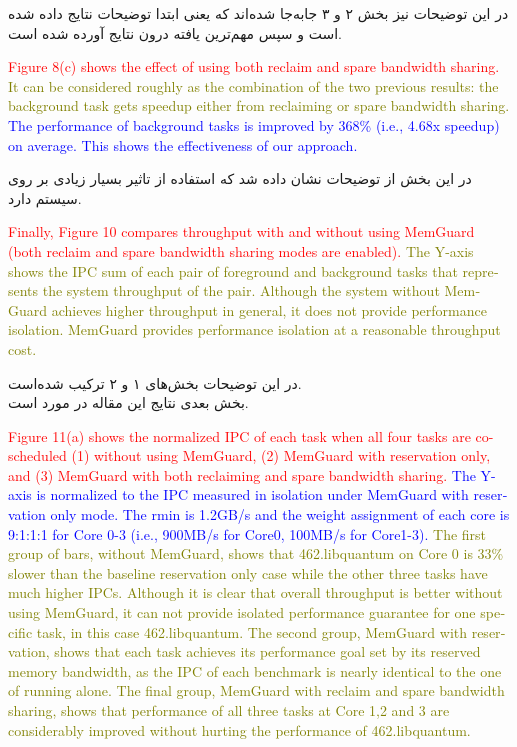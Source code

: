 \documentclass[a4paper, 11pt]{article}
\begin{document}
در این توضیحات نیز بخش ۲ و ۳ جابه‌جا شده‌اند که یعنی ابتدا توضیحات نتایج داده شده است و سپس
مهم‌ترین یافته درون نتایج آورده شده است.
\begin{latin}
\textcolor{red}{Figure 8(c) shows the effect of using both reclaim and
spare bandwidth sharing.}
\textcolor{olive}{It can be considered roughly as
the combination of the two previous results: the background
task gets speedup either from reclaiming or spare bandwidth
sharing.}
\textcolor{blue}{The performance of background tasks is improved by
368\% (i.e., 4.68x speedup) on average. This shows the
effectiveness of our approach.}
\end{latin}
در این بخش از توضیحات نشان داده شد که استفاده از
تاثیر بسیار زیادی بر روی
سیستم دارد.
\begin{latin}
\textcolor{red}{Finally, Figure 10 compares throughput with and without
using MemGuard (both reclaim and spare bandwidth sharing
modes are enabled).}
\textcolor{olive}{The Y-axis shows the IPC sum of each
pair of foreground and background tasks that represents the
system throughput of the pair. Although the system without
MemGuard achieves higher throughput in general, it does not
provide performance isolation. MemGuard provides performance isolation at a reasonable throughput cost.}
\end{latin}
در این توضیحات بخش‌های ۱ و ۲ ترکیب شده‌است. \\
بخش بعدی نتایج این مقاله در مورد
است.
\begin{latin}
\textcolor{red}{Figure 11(a) shows the normalized IPC of each task when
all four tasks are co-scheduled (1) without using MemGuard,
(2) MemGuard with reservation only, and (3) MemGuard with
both reclaiming and spare bandwidth sharing.}
\textcolor{blue}{The Y-axis is
normalized to the IPC measured in isolation under MemGuard
with reservation only mode. The rmin is 1.2GB/s and the
weight assignment of each core is 9:1:1:1 for Core 0-3 (i.e.,
900MB/s for Core0, 100MB/s for Core1-3).}
\textcolor{olive}{The first group of bars, without MemGuard, shows that
462.libquantum on Core 0 is 33\% slower than the baseline
reservation only case while the other three tasks have much
higher IPCs. Although it is clear that overall throughput is
better without using MemGuard, it can not provide isolated
performance guarantee for one specific task, in this case
462.libquantum. The second group, MemGuard with reservation, shows that each task achieves its performance goal set by
its reserved memory bandwidth, as the IPC of each benchmark
is nearly identical to the one of running alone. The final
group, MemGuard with reclaim and spare bandwidth sharing,
shows that performance of all three tasks at Core 1,2 and 3
are considerably improved without hurting the performance of
462.libquantum.}
\end{latin}
\end{document}
